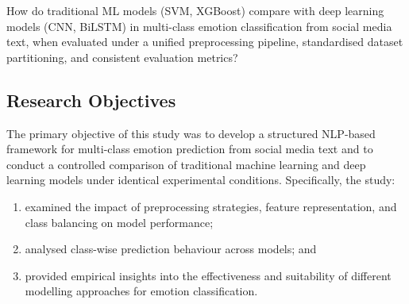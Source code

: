 How do traditional ML models (SVM, XGBoost) compare with deep learning models (CNN, BiLSTM) in multi-class emotion classification from social media text, when evaluated under a unified preprocessing pipeline, standardised dataset partitioning, and consistent evaluation metrics?

\subsection{Research Objectives}

The primary objective of this study was to develop a structured NLP-based framework for multi-class emotion prediction from social media text and to conduct a controlled comparison of traditional machine learning and deep learning models under identical experimental conditions. Specifically, the study:
\begin{enumerate}[nosep]
    \item examined the impact of preprocessing strategies, feature representation, and class balancing on model performance;
    \item analysed class-wise prediction behaviour across models; and
    \item provided empirical insights into the effectiveness and suitability of different modelling approaches for emotion classification.
\end{enumerate}
